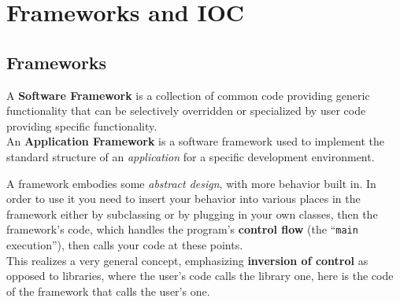 \chapter{Frameworks and IOC}
\section{Frameworks}

A \textbf{Software Framework}
is a collection of common code
providing generic functionality that can be selectively
overridden or specialized by user code providing
specific functionality.\\
An \textbf{Application Framework} is a software framework used to
implement the standard structure of an \textit{application} for
a specific development environment.


A framework embodies some \textit{abstract design}, with
more behavior built in.
In order to use it you need to insert your behavior into various places in the framework either by subclassing or by plugging in your own classes,
then 
the framework’s code, which handles the program's \textbf{control flow} (the ``\texttt{main} execution''), then calls your code at these points.\\
This realizes a very general concept, emphasizing \textbf{inversion of
control} as opposed to libraries,
where the user's code calls the library one,
here is the code of the framework that calls the user's one.


